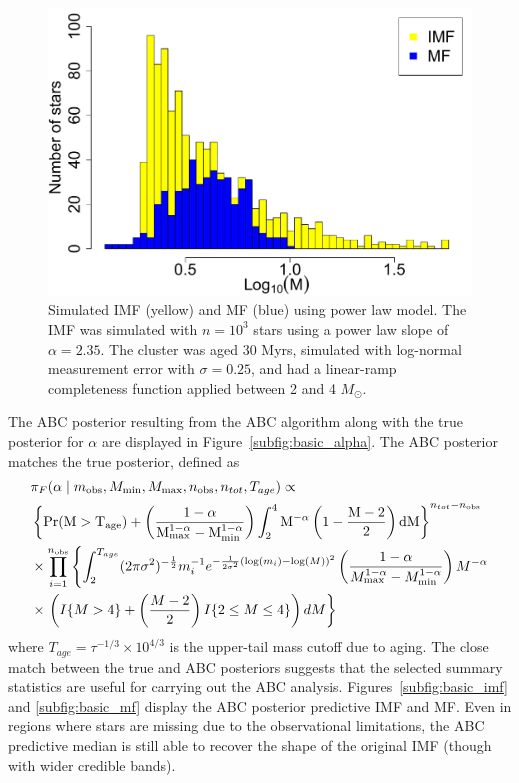 \documentclass[12pt]{article}
\newcommand{\Proba}{\rm{Pr}}
\newcommand{\Msun}{M_{\odot}}
\newcommand{\mobs}{m_{\text{obs}}}
\newcommand{\nobs}{n_{\text{obs}}}
\begin{document}
\begin{figure}[htbp]
\centering
\includegraphics[width=.5\textwidth]{figures/sim_basic_imf_mf_log10.pdf}       
\caption{Simulated IMF (yellow) and MF (blue) using power law model.  The IMF was simulated with $n = 10^3$ stars using a power law slope of $\alpha = 2.35$.  The cluster was aged 30 Myrs, simulated with log-normal measurement error with $\sigma = 0.25$, and had a linear-ramp completeness function applied between 2 and 4 $\Msun$.
} \label{fig:abc_simple_data}
\end{figure}





The ABC posterior resulting from the ABC algorithm along with the true posterior for $\alpha$ are displayed in Figure~\ref{subfig:basic_alpha}.  The ABC posterior matches the true posterior, defined as 
\begin{align}
&\pi_F(\alpha \mid  \mobs, M_{\min}, M_{\max}, \nobs, n_{tot}, T_{age}) \propto  \label{eq:simple_posterior}\\ 
&\left \{\Proba(M>T_{age})+\left(\frac{1-\alpha}{M_{\max}^{1-\alpha}-M_{\min}^{1-\alpha}}\right)\int_2^4 M^{-\alpha}\left(1-\frac{M-2}{2}\right )dM\right \}^{n_{tot}-\nobs}  \nonumber \\ \nonumber
& \times \prod_{i=1}^{\nobs}\left\{ \int_2^{T_{age}}(2\pi\sigma^2)^{-\frac{1}{2}}m_i^{-1}e^{-\frac{1}{2\sigma^2}(\log(m_i)-\log(M))^2} \left(\frac{1-\alpha}{M_{\max}^{1-\alpha}-M_{\min}^{1-\alpha}}\right)M^{-\alpha} \right.\\ \nonumber
& \times  \left.\left(I\{M>4\}+\left(\frac{M-2}{2}\right)I\{2\leq M\leq 4\}\right) dM \right\} 
\end{align}
where $T_{age} = \tau^{-1/3} \times 10^{4/3}$ is the upper-tail mass cutoff due to aging.  The close match between the true and ABC posteriors suggests that the selected summary statistics are useful for carrying out the ABC analysis.  Figures~\ref{subfig:basic_imf} and \ref{subfig:basic_mf} display the ABC posterior predictive IMF and MF.  Even in regions where stars are missing due to the observational limitations, the ABC predictive median is still able to recover the shape of the original IMF (though with wider credible bands).
\end{document}
